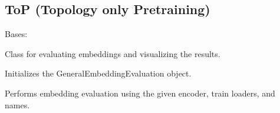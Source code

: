 \documentclass[letterpaper,10pt,english]{sphinxhowto}
\begin{document}
\sphinxstepscope


\subsection{ToP (Topology only Pre\sphinxhyphen{}training)}
\label{\detokenize{top:module-top}}\label{\detokenize{top:top-topology-only-pre-training}}\label{\detokenize{top::doc}}

\begin{fulllineitems}
\label{\detokenize{top:top.GeneralEmbeddingEvaluation}}
\pysigstartsignatures
{}
\pysigstopsignatures
\sphinxAtStartPar
Bases: 

\sphinxAtStartPar
Class for evaluating embeddings and visualizing the results.

\begin{fulllineitems}
\label{\detokenize{top:top.GeneralEmbeddingEvaluation.__init__}}
\pysigstartsignatures
{}
\pysigstopsignatures
\sphinxAtStartPar
Initializes the GeneralEmbeddingEvaluation object.

\end{fulllineitems}


\begin{fulllineitems}
\label{\detokenize{top:top.GeneralEmbeddingEvaluation.embedding_evaluation}}
\pysigstartsignatures
{}
\pysigstopsignatures
\sphinxAtStartPar
Performs embedding evaluation using the given encoder, train loaders, and names.

\end{fulllineitems}


\end{fulllineitems}
\end{document}
